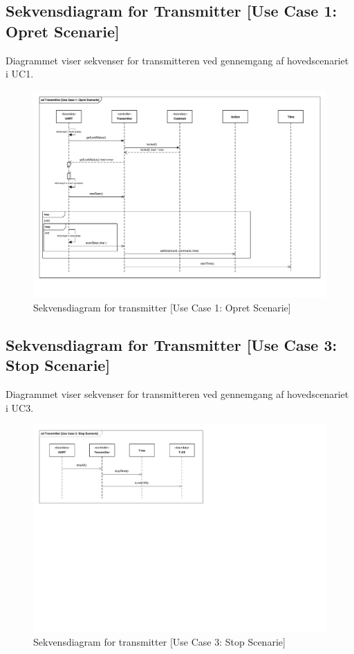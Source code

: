 \clearpage
\begin{landscape}
\subsection{Sekvensdiagram for Transmitter [Use Case 1: Opret Scenarie]}
Diagrammet viser sekvenser for transmitteren ved gennemgang af hovedscenariet i UC1.
\begin{figure}[h]
	\centering %
	\includegraphics[height={\textwidth - 3.2 cm},trim=18 50 17 17, clip=true]{Systemarkitektur/Diagrammer/Transmitter_UC1_Sekvens.pdf}%
	\caption{Sekvensdiagram for transmitter [Use Case 1: Opret Scenarie]}
	\label{fig:Trans_UC1Sek}
\end{figure}
\end{landscape}

\clearpage
\subsection{Sekvensdiagram for Transmitter [Use Case 3: Stop Scenarie]}
Diagrammet viser sekvenser for transmitteren ved gennemgang af hovedscenariet i UC3.
\begin{figure}[h]
	\centering
	\includegraphics[width=\textwidth, trim=17 365 353 18, clip=true]{Systemarkitektur/Diagrammer/Transmitter_UC3_Sekvens.pdf}
	\caption{Sekvensdiagram for transmitter [Use Case 3: Stop Scenarie]}
	\label{fig:Trans_UC3Sek}
\end{figure}

